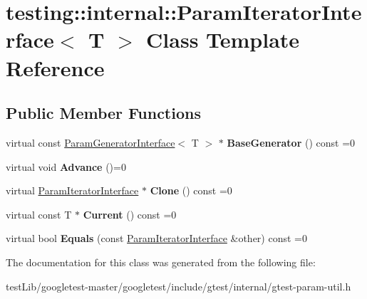 \hypertarget{classtesting_1_1internal_1_1ParamIteratorInterface}{}\section{testing\+:\+:internal\+:\+:Param\+Iterator\+Interface$<$ T $>$ Class Template Reference}
\label{classtesting_1_1internal_1_1ParamIteratorInterface}
\subsection*{Public Member Functions}
\begin{DoxyCompactItemize}
\item 
\mbox{\label{classtesting_1_1internal_1_1ParamIteratorInterface_a17500953df75ecda1ace46c08ff731e9}} 
virtual const \hyperlink{classtesting_1_1internal_1_1ParamGeneratorInterface}{Param\+Generator\+Interface}$<$ T $>$ $\ast$ {\bfseries Base\+Generator} () const =0
\item 
\mbox{\label{classtesting_1_1internal_1_1ParamIteratorInterface_a600dbd35fcb551463e379516a1abea48}} 
virtual void {\bfseries Advance} ()=0
\item 
\mbox{\label{classtesting_1_1internal_1_1ParamIteratorInterface_a4998c23e27e2943d97546011aa35db80}} 
virtual \hyperlink{classtesting_1_1internal_1_1ParamIteratorInterface}{Param\+Iterator\+Interface} $\ast$ {\bfseries Clone} () const =0
\item 
\mbox{\label{classtesting_1_1internal_1_1ParamIteratorInterface_adfff808576d929085679c315b255af7e}} 
virtual const T $\ast$ {\bfseries Current} () const =0
\item 
\mbox{\label{classtesting_1_1internal_1_1ParamIteratorInterface_a9d811697a752d46f7bd6a0082f9040a3}} 
virtual bool {\bfseries Equals} (const \hyperlink{classtesting_1_1internal_1_1ParamIteratorInterface}{Param\+Iterator\+Interface} \&other) const =0
\end{DoxyCompactItemize}


The documentation for this class was generated from the following file\+:\begin{DoxyCompactItemize}
\item 
test\+Lib/googletest-\/master/googletest/include/gtest/internal/gtest-\/param-\/util.\+h\end{DoxyCompactItemize}
